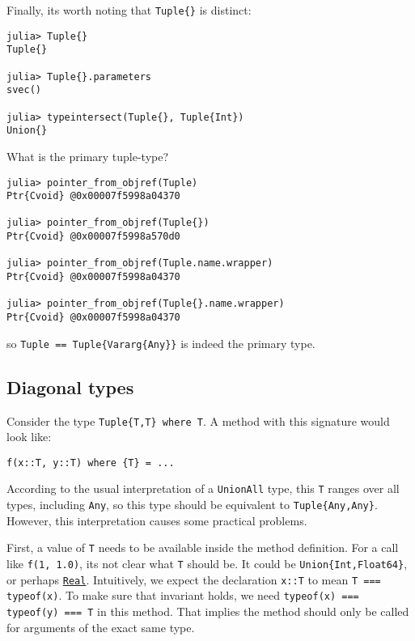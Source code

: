 Finally, it{\textquotesingle}s worth noting that \texttt{Tuple\{\}} is distinct:




\begin{verbatim}
julia> Tuple{}
Tuple{}

julia> Tuple{}.parameters
svec()

julia> typeintersect(Tuple{}, Tuple{Int})
Union{}
\end{verbatim}



What is the {\textquotedbl}primary{\textquotedbl} tuple-type?




\begin{verbatim}
julia> pointer_from_objref(Tuple)
Ptr{Cvoid} @0x00007f5998a04370

julia> pointer_from_objref(Tuple{})
Ptr{Cvoid} @0x00007f5998a570d0

julia> pointer_from_objref(Tuple.name.wrapper)
Ptr{Cvoid} @0x00007f5998a04370

julia> pointer_from_objref(Tuple{}.name.wrapper)
Ptr{Cvoid} @0x00007f5998a04370
\end{verbatim}



so \texttt{Tuple == Tuple\{Vararg\{Any\}\}} is indeed the primary type.



\hypertarget{5206945150982308765}{}


\subsection{Diagonal types}



Consider the type \texttt{Tuple\{T,T\} where T}. A method with this signature would look like:




\begin{verbatim}
f(x::T, y::T) where {T} = ...
\end{verbatim}



According to the usual interpretation of a \texttt{UnionAll} type, this \texttt{T} ranges over all types, including \texttt{Any}, so this type should be equivalent to \texttt{Tuple\{Any,Any\}}. However, this interpretation causes some practical problems.



First, a value of \texttt{T} needs to be available inside the method definition. For a call like \texttt{f(1, 1.0)}, it{\textquotesingle}s not clear what \texttt{T} should be. It could be \texttt{Union\{Int,Float64\}}, or perhaps \hyperlink{6175959395021454412}{\texttt{Real}}. Intuitively, we expect the declaration \texttt{x::T} to mean \texttt{T === typeof(x)}. To make sure that invariant holds, we need \texttt{typeof(x) === typeof(y) === T} in this method. That implies the method should only be called for arguments of the exact same type.



